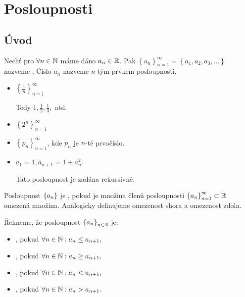 \section{Posloupnosti}

\subsection{Úvod}
\begin{definition}
    Nechť pro $\forall n \in \mathbb{N}$ máme dáno $a_n \in \mathbb{R}$. Pak 
    $\left\{a_n\right\}_{n=1}^{\infty} = \left\{a_1, a_2, a_3, \dots \right\}$
    nazveme . Číslo $a_n$ nazveme 
    $n$-tým prvkem posloupnosti.
\end{definition}

\begin{remark}
    \leavevmode
    \begin{multicols}{2}
        \begin{itemize}
            \item $\left\{\frac{1}{n}\right\}_{n=1}^\infty$
                
                Tedy $1, \frac{1}{2}, \frac{1}{3},$ atd.

            \item $\left\{2^n\right\}_{n=1}^\infty$

            \item $\left\{p_n\right\}_{n=1}^\infty$, kde $p_n$ je $n$-té prvočíslo.

            \item $a_1=1, a_{n+1} = 1 + a_n^2.$ 
                
                Tato posloupnost je zadána rekursivně.
        \end{itemize}
    \end{multicols}
\end{remark}

\begin{definition}
    Posloupnost $\left\{a_n\right\}$ je , pokud je množina členů 
    posloupnosti $\left\{a_n\right\}_{n=1}^\infty \subset \mathbb{R}$ omezená množina. 
    Analogicky definujeme omezenost shora a omezenost zdola.
\end{definition}

\begin{definition}
    Řekneme, že posloupnost $\left\{a_n\right\}_{n\in\mathbb{N}}$ je:
    \begin{itemize}
        \item {}, pokud $\forall n \in \mathbb{N}: a_n \leq a_{n+1},$
        \item {}, pokud $\forall n \in \mathbb{N}: a_n \geq a_{n+1},$
        \item {}, pokud $\forall n \in \mathbb{N}: a_n < a_{n+1},$
        \item {}, pokud $\forall n \in \mathbb{N}: a_n > a_{n+1}.$
    \end{itemize}
\end{definition}

